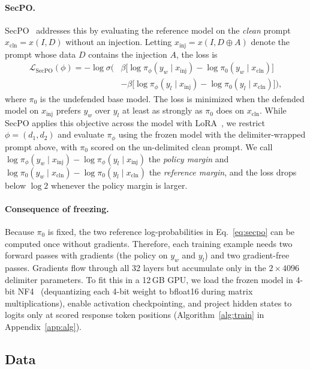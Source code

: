 \documentclass{article}
\newcommand{\xinj}{x_{\mathrm{inj}}}
\newcommand{\xcln}{x_{\mathrm{cln}}}
\begin{document}
\paragraph{SecPO.} SecPO~\cite{chen2026secpo} addresses this by evaluating the reference model on the \emph{clean} prompt $\xcln = x(I, D)$ without an injection. Letting $\xinj = x(I, D \oplus A)$ denote the prompt whose data $D$ contains the injection $A$, the loss is
\begin{equation}
  \begin{split}
  \mathcal{L}_{\mathrm{SecPO}}(\phi) = -\log \sigma\!\Big(
  &\beta\big[\log \pi_\phi(y_w \mid \xinj) - \log \pi_0(y_w \mid \xcln)\big] \\
  &- \beta\big[\log \pi_\phi(y_l \mid \xinj) - \log \pi_0(y_l \mid \xcln)\big]\Big),
  \end{split}
  \label{eq:secpo}
\end{equation}
where $\pi_0$ is the undefended base model. The loss is minimized when the defended model on $\xinj$ prefers $y_w$ over $y_l$ at least as strongly as $\pi_0$ does on $\xcln$. While SecPO applies this objective across the model with LoRA~\cite{hu2022lora}, we restrict $\phi = (d_1, d_2)$ and evaluate $\pi_\phi$ using the frozen model with the delimiter-wrapped prompt above, with $\pi_0$ scored on the un-delimited clean prompt. We call $\log \pi_\phi(y_w \mid \xinj) - \log \pi_\phi(y_l \mid \xinj)$ the \emph{policy margin} and $\log \pi_0(y_w \mid \xcln) - \log \pi_0(y_l \mid \xcln)$ the \emph{reference margin}, and the loss drops below $\log 2$ whenever the policy margin is larger.

\paragraph{Consequence of freezing.} Because $\pi_0$ is fixed, the two reference log-probabilities in Eq.~\eqref{eq:secpo} can be computed once without gradients. Therefore, each training example needs two forward passes with gradients (the policy on $y_w$ and $y_l$) and two gradient-free passes. Gradients flow through all 32 layers but accumulate only in the $2 \times 4096$ delimiter parameters. To fit this in a 12\,GB GPU, we load the frozen model in 4-bit NF4~\cite{dettmers2023qlora} (dequantizing each 4-bit weight to bfloat16 during matrix multiplications), enable activation checkpointing, and project hidden states to logits only at scored response token positions (Algorithm~\ref{alg:train} in Appendix~\ref{app:alg}).

\subsection{Data}
\label{sec:data}
\end{document}

